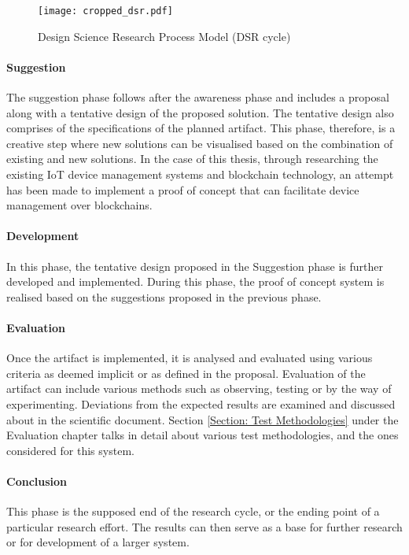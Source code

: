 \documentclass[english]{tktltiki}
\begin{document}
\begin{figure}[H]
\begin{center}
\texttt{[image: cropped\_dsr.pdf]}
\caption{Design Science Research Process Model (DSR cycle)}
\label{dsr}
\end{center}
\end{figure}

\paragraph{Suggestion} The suggestion phase follows after the awareness phase and includes a proposal along with a tentative design of the proposed solution. The tentative design also comprises of the specifications of the planned artifact. This phase, therefore, is a creative step where new solutions can be visualised based on the combination of existing and new solutions. In the case of this thesis, through researching the existing IoT device management systems and blockchain technology, an attempt has been made to implement a proof of concept that can facilitate device management over blockchains.

\paragraph{Development} In this phase, the tentative design proposed in the Suggestion phase is further developed and implemented. During this phase, the proof of concept system is realised based on the suggestions proposed in the previous phase. 

\paragraph{Evaluation} Once the artifact is implemented, it is analysed and evaluated using various criteria as deemed implicit or as defined in the proposal. Evaluation of the artifact can include various methods such as observing, testing or by the way of experimenting. Deviations from the expected results are examined and discussed about in the scientific document. Section \ref{Section: Test Methodologies} under the Evaluation chapter talks in detail about various test methodologies, and the ones considered for this system.

\paragraph{Conclusion} This phase is the supposed end of the research cycle, or the ending point of a particular research effort. The results can then serve as a base for further research or for development of a larger system.
\newpage
\end{document}

